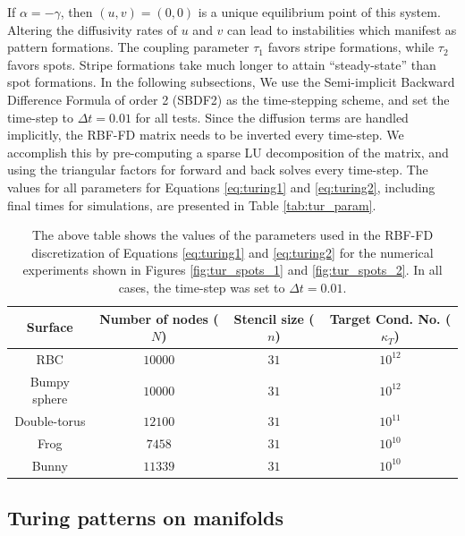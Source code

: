 \documentclass[smallextended]{svjour3}
\begin{document}
%
If $\alpha = -\gamma$, then $(u,v) = (0,0)$ is a unique equilibrium point of this system. Altering the diffusivity rates of $u$ and $v$ can lead to instabilities which manifest as pattern formations. The coupling parameter $\tau_1$ favors stripe formations, while $\tau_2$ favors spots. Stripe formations take much longer to attain ``steady-state'' than spot formations. In the following subsections,  We use the Semi-implicit Backward Difference Formula of order 2 (SBDF2) as the time-stepping scheme, and set the time-step to $\Delta t = 0.01$ for all tests. Since the diffusion terms are handled implicitly, the RBF-FD matrix needs to be inverted every time-step. We accomplish this by pre-computing a sparse LU decomposition of the matrix, and using the triangular factors for forward and back solves every time-step.  The values for all parameters for Equations \eqref{eq:turing1} and \eqref{eq:turing2}, including final times for simulations, are presented in Table \ref{tab:tur_param}.
%
\begin{table}[ht]
\centering
\begin{tabular}{|c|c|c|c|}
\hline
\textbf{Surface} & Number of nodes ($N$)  & Stencil size ($n$) & Target Cond. No. ($\kappa_T$) \\ \toprule \hline
RBC & $10000$ & $31$ & $10^{12}$\\\hline
Bumpy sphere & $10000$ & $31$ & $10^{12}$ \\\hline
Double-torus & $12100$ & $31$ & $10^{11}$ \\\hline
Frog & $7458$ & $31$ & $10^{10}$ \\\hline
Bunny & $11339$ & $31$ &$ 10^{10}$ \\\hline
\end{tabular}
\caption{The above table shows the values of the parameters used in the RBF-FD discretization of Equations \eqref{eq:turing1} and \eqref{eq:turing2} for the numerical experiments shown in Figures \ref{fig:tur_spots_1} and \ref{fig:tur_spots_2}. In all cases, the time-step was set to $\Delta t = 0.01$.}
\label{tab:tur_simparam}
\end{table}

\subsection{Turing patterns on manifolds}
\end{document}
